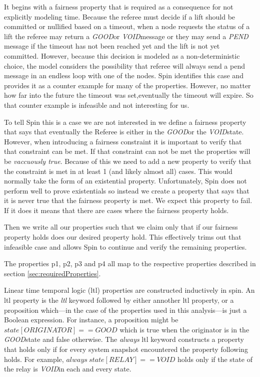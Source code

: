 \documentclass[runningheads]{llncs}
\newcommand{\void}{\emph{VOID}}
\newcommand{\good}{\emph{GOOD}}
\begin{document}
It begins with a fairness property that is required as a consequence for not explicitly modeling time. Because the referee must decide if a lift should be committed or nullified based on a timeout, when a node requests the status of a lift the referee may return a \good or \void message or they may send a \emph{PEND} message if the timeout has not been reached yet and the lift is not yet committed. However, because this decision is modeled as a non-deterministic choice, the model considers the possibility that referee will always send a pend message in an endless loop with one of the nodes. Spin identifies this case and provides it as a counter example for many of the properties. However, no matter how far into the future the timeout was set,eventually the timeout will expire. So that counter example is infeasible and not interesting for us. 

To tell Spin this is a case we are not interested in we define a fairness property that says that eventually the Referee is either in the \good or the \void state. However, when introducing a fairness constraint it is important to verify that that constraint can be met. If that constraint can not be met the properties will be \emph{vaccuously true}. Because of this we need to add a new property to verify that the constraint is met in at least 1 (and likely almost all) cases. This would normally take the form of an existential property. Unfortunately, Spin does not perform well to prove existentials so instead we create a property that says that it is never true that the fairness property is met. We expect this property to fail. If it does it means that there are cases where the fairness property holds.

Then we write all our properties such that we claim only that if our fairness property holds does our desired property hold. This effectively trims out that infeasible case and allows Spin to continue and verify the remaining properties. 

The properties p1, p2, p3 and p4 all map to the respective properties described in section \ref{sec:requiredProperties}. 

Linear time temporal logic (ltl) properties are constructed inductively in spin. An ltl property is the \emph{ltl} keyword followed by either annother ltl property, or a proposition which---in the case of the properties used in this analysis---is just a Boolean expression. For instance, a proposition might be $state[ORIGINATOR] == GOOD$ which is true when the originator is in the \good state and false otherwise. The \emph{always} ltl keyword constructs a property that holds only if for every system snapshot encountered the property following holds. For example, $always~state[RELAY] == VOID$ holds only if the state of the relay is \void in each and every state. 
\end{document}
